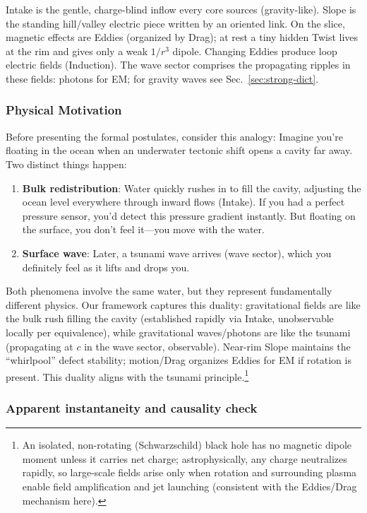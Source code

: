 Intake is the gentle, charge-blind inflow every core sources (gravity-like). Slope is the standing hill/valley electric piece written by an oriented link. On the slice, magnetic effects are Eddies (organized by Drag); at rest a tiny hidden Twist lives at the rim and gives only a weak $1/r^3$ dipole. Changing Eddies produce loop electric fields (Induction). The wave sector comprises the propagating ripples in these fields: photons for EM; for gravity waves see Sec.~\ref{sec:strong-dict}.


\subsubsection{Physical Motivation}

Before presenting the formal postulates, consider this analogy: Imagine you're floating in the ocean when an underwater tectonic shift opens a cavity far away. Two distinct things happen:

\begin{enumerate}
\item \textbf{Bulk redistribution}: Water quickly rushes in to fill the cavity, adjusting the ocean level everywhere through inward flows (Intake). If you had a perfect pressure sensor, you'd detect this pressure gradient instantly. But floating on the surface, you don't feel it---you move with the water.
\item \textbf{Surface wave}: Later, a tsunami wave arrives (wave sector), which you definitely feel as it lifts and drops you.
\end{enumerate}

Both phenomena involve the same water, but they represent fundamentally different physics. Our framework captures this duality: gravitational fields are like the bulk rush filling the cavity (established rapidly via Intake, unobservable locally per equivalence), while gravitational waves/photons are like the tsunami (propagating at $c$ in the wave sector, observable). Near-rim Slope maintains the ``whirlpool'' defect stability; motion/Drag organizes Eddies for EM if rotation is present. This duality aligns with the tsunami principle.\footnote{An isolated, non-rotating (Schwarzschild) black hole has no magnetic dipole moment unless it carries net charge; astrophysically, any charge neutralizes rapidly, so large-scale fields arise only when rotation and surrounding plasma enable field amplification and jet launching (consistent with the Eddies/Drag mechanism here).}

\subsubsection{Apparent instantaneity and causality check}\label{sec:tsunami-causality}

